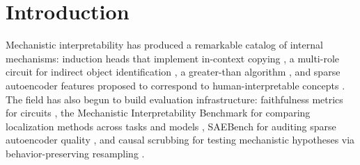 \documentclass{article}
\begin{document}
\begin{abstract}
Applied to 13 published claims in mechanistic interpretability of neural networks, the tier system discriminates sharply. Claims range from Proposed (probing classifiers, which establish decodability without causal intervention) through Causally Suggestive and Mechanistically Supported to Triangulated (induction heads, with converging structural, causal, and cross-context evidence)---with every verdict traceable to specific present or missing evidence. One claim---gender bias circuits---reaches Disconfirmed: the construct itself is incoherent, because the heads mediating ``bias'' are the same heads encoding grammatical gender. No published claim currently reaches Validated. The gap between what the field asserts and what the evidence warrants is systematic, not idiosyncratic.
\end{abstract}

\section{Introduction}
\label{sec:intro}

Mechanistic interpretability has produced a remarkable catalog of internal mechanisms:
induction heads that implement in-context copying \citep{olsson2022context}, a multi-role
circuit for indirect object identification \citep{wang2023interpretability}, a greater-than
algorithm \citep{hanna2023greater}, and sparse autoencoder features proposed to correspond
to human-interpretable concepts \citep{cunningham2023sparse, bricken2024monosemanticity}. The field has also begun to
build evaluation infrastructure: faithfulness metrics for circuits
\citep{miller2024transformer}, the Mechanistic Interpretability Benchmark for comparing
localization methods across tasks and models \citep{mueller2025mib}, SAEBench for auditing
sparse autoencoder quality \citep{karvonen2025saebench}, and causal scrubbing for testing
mechanistic hypotheses via behavior-preserving resampling \citep{chan2022causal}.
\end{document}
